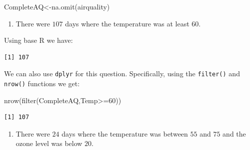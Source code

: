 \documentclass[
  letterpaper,
  DIV=11,
  numbers=noendperiod]{scrreprt}
\newenvironment{Shaded}{\begin{snugshade}}{\end{snugshade}}
\newcommand{\DecValTok}[1]{\textcolor[rgb]{0.68,0.00,0.00}{#1}}
\newcommand{\FunctionTok}[1]{\textcolor[rgb]{0.28,0.35,0.67}{#1}}
\newcommand{\NormalTok}[1]{\textcolor[rgb]{0.00,0.23,0.31}{#1}}
\newcommand{\OtherTok}[1]{\textcolor[rgb]{0.00,0.23,0.31}{#1}}
\newcommand{\SpecialCharTok}[1]{\textcolor[rgb]{0.37,0.37,0.37}{#1}}
\providecommand{\tightlist}{%
  \setlength{\itemsep}{0pt}\setlength{\parskip}{0pt}}\usepackage{longtable,booktabs,array}
\begin{document}
\begin{Shaded}
\begin{Highlighting}[numbers=left,,]
\NormalTok{CompleteAQ}\OtherTok{\textless{}{-}}\FunctionTok{na.omit}\NormalTok{(airquality)}
\end{Highlighting}
\end{Shaded}

\begin{blackbox}

\begin{enumerate}
\def\labelenumi{\arabic{enumi}.}
\setcounter{enumi}{4}
\tightlist
\item
  There were \(107\) days where the temperature was at least \(60\).
\end{enumerate}

\end{blackbox}

Using base R we have:

\begin{Shaded}
\end{Shaded}

\begin{verbatim}
[1] 107
\end{verbatim}

We can also use \texttt{dplyr} for this question. Specifically, using
the \texttt{filter()} and \texttt{nrow()} functions we get:

\begin{Shaded}
\begin{Highlighting}[numbers=left,,]
\FunctionTok{nrow}\NormalTok{(}\FunctionTok{filter}\NormalTok{(CompleteAQ,Temp}\SpecialCharTok{\textgreater{}=}\DecValTok{60}\NormalTok{))}
\end{Highlighting}
\end{Shaded}

\begin{verbatim}
[1] 107
\end{verbatim}

\begin{blackbox}

\begin{enumerate}
\def\labelenumi{\arabic{enumi}.}
\setcounter{enumi}{5}
\tightlist
\item
  There were \(24\) days where the temperature was between \(55\) and
  \(75\) and the ozone level was below \(20\).
\end{enumerate}

\end{blackbox}
\end{document}
